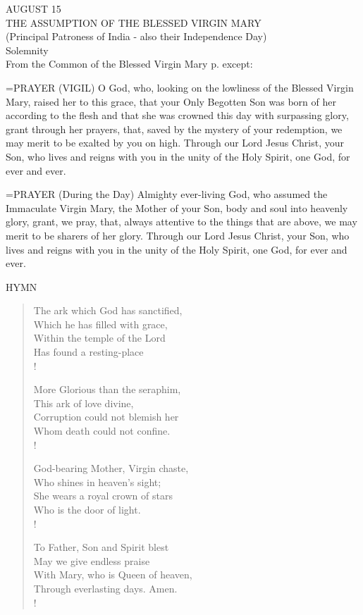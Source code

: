 \begin{center}\normalsize AUGUST 15\\
\footnotesize THE ASSUMPTION OF THE BLESSED VIRGIN MARY\\
\footnotesize (Principal Patroness of India - also their Independence Day)\\
\footnotesize Solemnity\\
\footnotesize From the Common of the Blessed Virgin Mary p.    except:\\
\end{center}

\hangindent=\parindent \small{PRAYER 
(VIGIL)
O God, who, looking on the lowliness of the Blessed Virgin Mary,
raised her to this grace,
that your Only Begotten Son was born of her according to the flesh
and that she was crowned this day with surpassing glory,
grant through her prayers,
that, saved by the mystery of your redemption,
we may merit to be exalted by you on high.
Through our Lord Jesus Christ, your Son,
who lives and reigns with you in the unity of the Holy Spirit,
one God, for ever and ever.\\}
 
\hangindent=\parindent \small{PRAYER 
(During the Day)
Almighty ever-living God,
who assumed the Immaculate Virgin Mary, the Mother of your Son,
body and soul into heavenly glory,
grant, we pray,
that, always attentive to the things that are above,
we may merit to be sharers of her glory.
Through our Lord Jesus Christ, your Son,
who lives and reigns with you in the unity of the Holy Spirit,
one God, for ever and ever.\\}
 

\noindent\small{\uppercase{Hymn}}\normalsize\label{assumption:hymn}
\begin{verse}
The ark which God has sanctified,\\
Which he has filled with grace,\\
Within the temple of the Lord\\
Has found a resting-place\\!

More Glorious than the seraphim,\\
This ark of love divine,\\
Corruption could not blemish her\\
Whom death could not confine.\\!

God-bearing Mother, Virgin chaste,\\
Who shines in heaven’s sight;\\
She wears a royal crown of stars\\
Who is the door of light.\\!

To Father, Son and Spirit blest\\
May we give endless praise\\
With Mary, who is Queen of heaven,\\
Through everlasting days. Amen.\\!
\end{verse}

